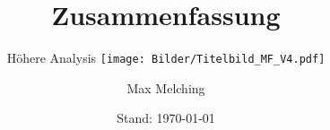 

\usepackage{subfiles}


\makeindex


\pagestyle{plain.scrheadings}

\begin{titlepage}
\centering
\title{Zusammenfassung}

\subtitle{Höhere Analysis
%
\texttt{[image: Bilder/Titelbild\_MF\_V4.pdf]}%
%
\vspace{-2cm}
}

\author{Max Melching}
\date{Stand: \today}
\maketitle
\end{titlepage}

\setcounter{page}{1}

